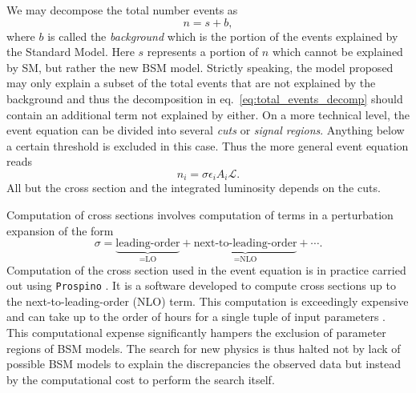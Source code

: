 We may decompose the total number events as
\begin{equation}\label{eq:total_events_decomp}
    n = s + b,
\end{equation}
where $b$ is called the \textit{background} which is the portion of the events explained by the Standard Model. Here $s$ represents a portion of $n$ which cannot be explained by SM, but rather the new BSM model. Strictly speaking, the model proposed may only explain a subset of the total events that are not explained by the background and thus the decomposition in eq.~\eqref{eq:total_events_decomp} should contain an additional term not explained by either. 
On a more technical level, the event equation can be divided into several \textit{cuts} or \textit{signal regions}. Anything below a certain threshold is excluded in this case. Thus the more general event equation reads
\begin{equation}\label{eq:general_event_eq}
    n_i = \sigma \epsilon_i A_i \mathcal{L}.
\end{equation} 
All but the cross section and the integrated luminosity depends on the cuts.


Computation of cross sections involves computation of terms in a perturbation expansion of the form 
\begin{equation}
    \sigma = \underbrace{\text{leading-order}}_{=\text{LO}} + \underbrace{\text{next-to-leading-order}}_{=\text{NLO}} + \cdots.
\end{equation}
Computation of the cross section used in the event equation is in practice carried out using {\tt Prospino} \cite{prospino}. It is a software developed to compute cross sections up to the next-to-leading-order (NLO) term. This computation is exceedingly expensive and can take up to the order of hours for a single tuple of input parameters \cite{xsec}. This computational expense significantly hampers the exclusion of parameter regions of BSM models. The search for new physics is thus halted not by lack of possible BSM models to explain the discrepancies the observed data but instead by the computational cost to perform the search itself.

